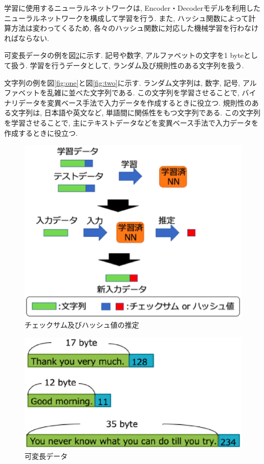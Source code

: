 \documentclass[11pt]{jbook}
\begin{document}
学習に使用するニューラルネットワークは, Encoder・Decoderモデル\cite{seq2seq}を利用したニューラルネットワークを構成して学習を行う.
また, ハッシュ関数によって計算方法は変わってくるため, 各々のハッシュ関数に対応した機械学習を行わなければならない.

可変長データの例を図\ref{kahen}に示す.
記号や数字, アルファベットの文字を1 byteとして扱う.
学習を行うデータとして, ランダム及び規則性のある文字列を扱う.

文字列の例を図\ref{fig:one}と図\ref{fig:two}に示す.
ランダム文字列は, 数字, 記号, アルファベットを乱雑に並べた文字列である.
この文字列を学習させることで, バイナリデータを変異ベース手法で入力データを作成するときに役立つ.
規則性のある文字列は, 日本語や英文など, 単語間に関係性をもつ文字列である.
この文字列を学習させることで, 主にテキストデータなどを変異ベース手法で入力データを作成するときに役立つ.

\begin{figure}[htbp]
\begin{center}
\includegraphics[width=130mm]{ataihantei.eps}
\caption{チェックサム及びハッシュ値の推定}
\label{suitei}
\end{center}
\end{figure}


\begin{figure}[htbp]
\begin{center}
\includegraphics[width=120mm]{kahen.eps}
\caption{可変長データ}
\label{kahen}
\end{center}
\end{figure}
\end{document}
